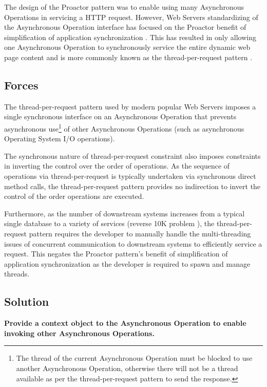 \documentclass[prodmode]{style/acmlarge}
\begin{document}
The design of the Proactor pattern was to enable using many Asynchronous
Operations in servicing a HTTP request.  However, Web Servers standardizing of
the Asynchronous Operation interface has focused on the Proactor benefit of
simplification of application synchronization \cite[p. 7]{proactor}.  This has
resulted in only allowing one Asynchronous Operation to synchronously service
the entire dynamic web page content and is more commonly known as the
thread-per-request pattern \cite{thread-per-request}.


\subsection{Forces}

The thread-per-request pattern used by modern popular Web Servers imposes a
single synchronous interface on an Asynchronous Operation that prevents
asynchronous use\footnote{The thread of the current Asynchronous Operation must
be blocked to use another Asynchronous Operation, otherwise there will not be a
thread available as per the thread-per-request pattern to send the response.} of
other Asynchronous Operations (such as asynchronous Operating System I/O
operations).

The synchronous nature of thread-per-request constraint also imposes constraints
in inverting the control over the order of operations.  As the sequence of
operations via thread-per-request is typically undertaken via synchronous direct
method calls, the thread-per-request pattern provides no indirection to invert
the control of the order operations are executed.

Furthermore, as the number of downstream systems increases from a typical single
database to a variety of services (reverse 10K problem
\cite{reverse-ten-k-problem}), the thread-per-request pattern requires the
developer to manually handle the multi-threading issues of concurrent
communication to downstream systems to efficiently service a request.  This
negates the Proactor pattern's benefit of simplification of application
synchronization \cite[p. 7]{proactor} as the developer is required to spawn and
manage threads.


\subsection{Solution}

\textbf{Provide a context object to the Asynchronous Operation to enable invoking other Asynchronous Operations.}
\end{document}
